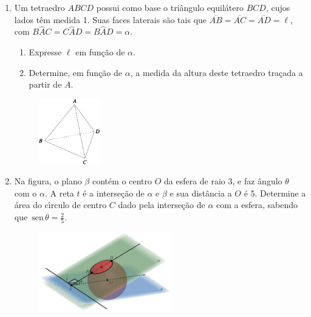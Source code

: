 \documentclass[a4paper,5pt]{amsbook}
\newcommand{\sen}{\,\mbox{sen}\,}
\begin{document}
\vspace{1cm}
\begin{enumerate}
    \item Um tetraedro $ABCD$ possui como base o tri\^angulo equil\'atero $BCD$,
        cujos lados t\^em medida 1. Suas faces laterais s\~ao tais que
        $\overline{AB} = \overline{AC} = \overline{AD} = \ell$, com $B\hat{A}C
        = C\hat{A}D = B\hat{A}D = \alpha$.
        \begin{enumerate}
            \vspace{0.3cm}
            \item Expresse $\ell$ em fun\c{c}\~ao de $\alpha$.
            \vspace{0.3cm}
            \item Determine, em fun\c{c}\~ao de $\alpha$, a medida da altura deste
                tetraedro tra\c{c}ada a partir de $A$.
        \end{enumerate}
        \begin{figure}[h]
            \centering
            \includegraphics[width=0.25\textwidth]{fig01-2.pdf}
        \end{figure}

    \item Na figura, o plano $\beta$ cont\'em o centro $O$ da esfera de raio 3, e
        faz \^angulo $\theta$ com o $\alpha$. A reta $t$ \'e a interse\c{c}\~ao de
        $\alpha$ e $\beta$ e sua dist\^ancia a $O$ \'e 5. Determine a \'area do
        c\'{\i}rculo de centro $C$ dado pela interse\c{c}\~ao de $\alpha$ com a esfera,
        sabendo que $\sen\theta = \frac{2}{5}$.
        \begin{figure}[h]
            \centering
            \includegraphics[width=0.55\textwidth]{fig01-3.png}
        \end{figure}


\end{enumerate}
\end{document}
